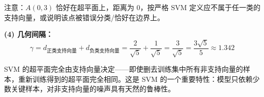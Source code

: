 \documentclass[a4paper,11pt]{ctexart}
\begin{document}
\begin{solutionbox}[参考答案与详细解析]
    注意：$A(0,3)$ 恰好在超平面上，距离为 0，按严格 SVM 定义应不属于任一类的支持向量，或说明该点被错误分类/恰好在边界上。

    \textbf{(4) 几何间隔：}
    \[
    \gamma = d_{\text{正类支持向量}} + d_{\text{负类支持向量}} = \frac{2}{\sqrt{5}} + \frac{1}{\sqrt{5}} = \frac{3}{\sqrt{5}} = \frac{3\sqrt{5}}{5} \approx 1.342
    \]

    \begin{keybox}[支持向量的特殊地位]
        SVM 的超平面完全由支持向量决定——即使删去训练集中所有非支持向量的样本，重新训练得到的超平面完全相同。这是 SVM 的一个重要特性：模型只依赖少数关键样本，对非支持向量的噪声具有天然的鲁棒性。
    \end{keybox}
\end{solutionbox}


\end{document}
